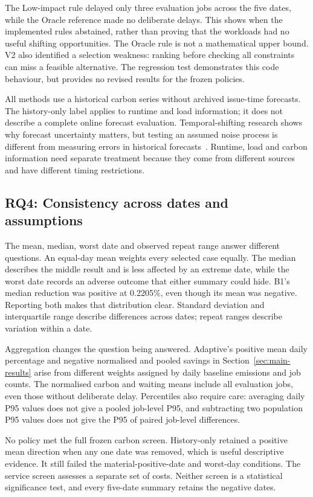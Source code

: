 The Low-impact rule delayed only three evaluation jobs across the five dates, while the Oracle reference made no deliberate delays. This shows when the implemented rules abstained, rather than proving that the workloads had no useful shifting opportunities. The Oracle rule is not a mathematical upper bound. V2 also identified a selection weakness: ranking before checking all constraints can miss a feasible alternative. The regression test demonstrates this code behaviour, but provides no revised results for the frozen policies.

All methods use a historical carbon series without archived issue-time forecasts. The history-only label applies to runtime and load information; it does not describe a complete online forecast evaluation. Temporal-shifting research shows why forecast uncertainty matters, but testing an assumed noise process is different from measuring errors in historical forecasts~\cite{wiesner2021wait}. Runtime, load and carbon information need separate treatment because they come from different sources and have different timing restrictions.

\subsection{RQ4: Consistency across dates and assumptions}
The mean, median, worst date and observed repeat range answer different questions. An equal-day mean weights every selected case equally. The median describes the middle result and is less affected by an extreme date, while the worst date records an adverse outcome that either summary could hide. B1's median reduction was positive at 0.2205\%, even though its mean was negative. Reporting both makes that distribution clear. Standard deviation and interquartile range describe differences across dates; repeat ranges describe variation within a date.

Aggregation changes the question being answered. Adaptive's positive mean daily percentage and negative normalised and pooled savings in Section~\ref{sec:main-results} arise from different weights assigned by daily baseline emissions and job counts. The normalised carbon and waiting means include all evaluation jobs, even those without deliberate delay. Percentiles also require care: averaging daily P95 values does not give a pooled job-level P95, and subtracting two population P95 values does not give the P95 of paired job-level differences.

No policy met the full frozen carbon screen. History-only retained a positive mean direction when any one date was removed, which is useful descriptive evidence. It still failed the material-positive-date and worst-day conditions. The service screen assesses a separate set of costs. Neither screen is a statistical significance test, and every five-date summary retains the negative dates.

